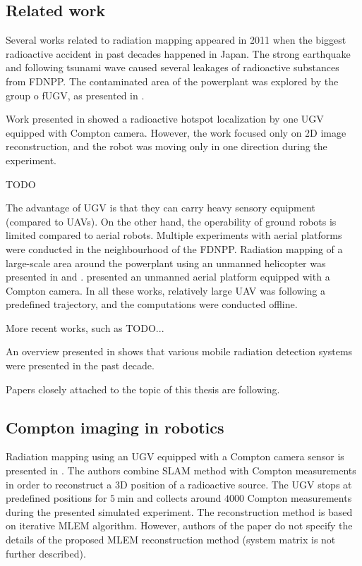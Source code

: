 \subsection{Related work}

Several works related to radiation mapping appeared in 2011 when the biggest radioactive accident in past decades happened in Japan.
The strong earthquake and following tsunami wave caused several leakages of radioactive substances from \ac{FDNPP}.
The contaminated area of the powerplant was explored by the group o f\ac{UGV}, as presented in \cite{fuku2012}.

Work presented in \cite{fuku_compton} showed a radioactive hotspot localization by one \ac{UGV} equipped with Compton camera.
However, the work focused only on 2D image reconstruction, and the robot was moving only in one direction during the experiment.

TODO

The advantage of \ac{UGV} is that they can carry heavy sensory equipment (compared to \ac{UAV}s).
On the other hand, the operability of ground robots is limited compared to aerial robots.
Multiple experiments with aerial platforms were conducted in the neighbourhood of the \ac{FDNPP}.
Radiation mapping of a large-scale area around the powerplant using an unmanned helicopter was presented in \cite{sanada2015} and \cite{towler2012}.
\cite{Jiang2015} presented an unmanned aerial platform equipped with a Compton camera. 
In all these works, relatively large \ac{UAV} was following a predefined trajectory, and the computations were conducted offline.

More recent works, such as TODO...

An overview presented in \cite{radiation_detection_systems_overview} shows that various mobile radiation detection systems were presented in the past decade.


 

Papers closely attached to the topic of this thesis are following.



\subsection{Compton imaging in robotics}
Radiation mapping using an \ac{UGV} equipped with a Compton camera sensor is presented in \cite{3D_compton_mobile_robot_2017}.
The authors combine \ac{SLAM} method with Compton measurements in order to reconstruct a 3D position of a radioactive source.
The \ac{UGV} stops at predefined positions for $\SI{5}{\minute}$ and collects around $4000$ Compton measurements during the presented simulated experiment.
The reconstruction method is based on iterative \ac{MLEM} algorithm.
However, authors of the paper do not specify the details of the proposed \ac{MLEM} reconstruction method (system matrix is not further described).

